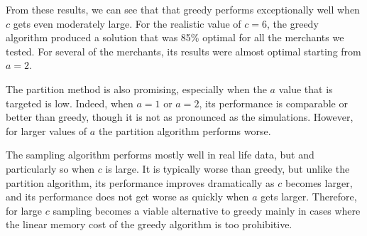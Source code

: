 From these results, we can see that that greedy performs exceptionally
well when $c$ gets even moderately large.  For the realistic value of
$c=6$, the greedy algorithm produced a solution that was 85\% optimal
for all the merchants we tested. For several of the merchants, its
results were almost optimal starting from $a=2$. \vs

The partition method is also promising, especially when the $a$ value
that is targeted is low. Indeed, when $a=1$ or $a=2$, its performance
is comparable or better than greedy, though it is not as pronounced as
the simulations. However, for larger values of $a$ the partition
algorithm performs worse. 

The sampling algorithm performs mostly well in real life data, but and
particularly so when $c$ is large. It is typically worse than
greedy, but unlike the partition algorithm, its performance improves
dramatically as $c$ becomes larger, and its performance does not get
worse as quickly when $a$ gets larger. Therefore, for large $c$ 
sampling becomes a viable alternative to greedy mainly in cases where the
linear memory cost of the greedy algorithm is too prohibitive. 
